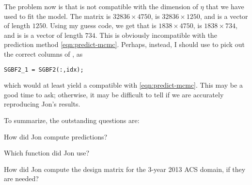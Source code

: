 \documentclass[10pt]{article}
\begin{document}
%
The problem now is that  is not compatible with the dimension of $\eta$ that we have used to fit the model. The matrix  is $32836 \times 4750$,  is $32836 \times 1250$, and  is a vector of length $1250$. Using my guess code, we get that  is $1838 \times 4750$,  is $1838 \times 734$, and  is is a vector of length $734$. This  is obviously incompatible with the prediction method \eqref{eqn:predict-mcmc}. Perhaps, instead, I should use  to pick out the correct columns of , as
%
\begin{lstlisting}
SGBF2_1 = SGBF2(:,idx);
\end{lstlisting}
%
which would at least yield a  compatible with \eqref{eqn:predict-mcmc}. This may be a good time to ask; otherwise, it may be difficult to tell if we are accurately reproducing Jon's results.

\vspace{1em}
\noindent
To summarize, the outstanding questions are:
%
\begin{enumerate*}
\item How did Jon compute predictions?
\item Which  function did Jon use?
\item How did Jon compute the design matrix for the 3-year 2013 ACS domain, if they are needed?
\end{enumerate*}




%
\end{document}
